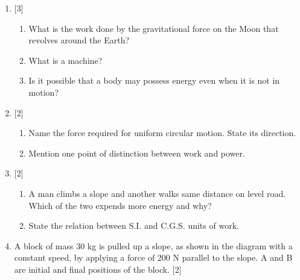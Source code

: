 \begin{enumerate}[label=(\roman*)]

    \item \hfill [3]
        \begin{enumerate}[label=(\alph*)]
            \item What is the work done by the gravitational force on 
                the Moon that revolves around the Earth?
            \item What is a machine?
            \item Is it possible that a body may possess energy even 
                when it is not in motion?
        \end{enumerate}

    \item \hfill [2]
        \begin{enumerate}[label=(\alph*)]
            \item Name the force required for uniform circular motion. State 
                its direction.
            \item Mention one point of distinction between work and power.
        \end{enumerate}


    \item \hfill [2]
        \begin{enumerate}[label=(\alph*)]
            \item A man climbs a slope and another walks same distance 
                on level road. Which of the two expends more energy and 
                why?
            \item State the relation between S.I. and C.G.S. units of work.
        \end{enumerate}

    \item A block of mass 30 kg is pulled up a slope, as shown in the 
        diagram with a constant speed, by applying a force of 200 N 
        parallel to the slope. A and B are initial and final positions 
        of the block. \hfill [2]


\end{enumerate}
